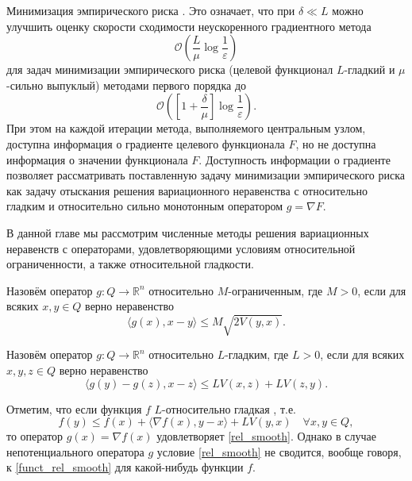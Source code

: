 \begin{example}{Минимизация эмпирического риска \cite{Hendr}.}
        Это означает, что при $\delta \ll L$ можно улучшить оценку скорости сходимости неускоренного градиентного метода $$\mathcal{O}\left(\frac{L}{\mu}\log\frac{1}{\varepsilon}\right)$$
        для задач минимизации эмпирического риска (целевой функционал $L$-гладкий и $\mu$-сильно выпуклый) методами первого порядка до $$\mathcal{O}\left(\left[1+\frac{\delta}{\mu}\right]\log\frac{1}{\varepsilon}\right).$$
        При этом на каждой итерации метода, выполняемого центральным узлом, доступна информация о градиенте целевого функционала $F$, но не доступна информация о значении функционала $F$. Доступность информации о градиенте позволяет рассматривать поставленную задачу минимизации эмпирического риска как задачу отыскания решения вариационного неравенства с относительно гладким и относительно сильно монотонным оператором $g = \nabla F$.
    \end{example}

    В данной главе мы рассмотрим численные методы решения вариационных неравенств с операторами, удовлетворяющими условиям относительной ограниченности, а также относительной гладкости.
    \begin{definition}\label{DefRelBound}\cite{Main}
        Назовём оператор $g: Q \longrightarrow \mathbb{R}^n$ относительно $M$-ограниченным, где $M >0$, если для всяких $x, y \in Q$ верно неравенство
        \begin{equation}\label{rel_bound}
             \langle g(x), x - y \rangle \leq M\sqrt{2V(y,x)}.
         \end{equation}
    \end{definition}
    \begin{definition}\cite{Inex}
        Назовём оператор $g: Q \longrightarrow \mathbb{R}^n$ относительно $L$-гладким, где $L > 0$, если для всяких $x, y, z \in Q$ верно неравенство
        \begin{equation}\label{rel_smooth}
            \langle g(y)-g(z),x-z\rangle \leq LV(x,z) + LV(z,y).
        \end{equation}
    \end{definition}
    Отметим, что если функция $f$ $L$-относительно гладкая \cite{Bauschke}, т.е.
    \begin{equation}\label{funct_rel_smooth}
        f(y) \leq f(x) + \langle \nabla f(x), y - x\rangle + LV(y, x) \quad \forall x, y \in Q,
    \end{equation}
    то оператор $g(x) = \nabla f(x)$ удовлетворяет \eqref{rel_smooth}. Однако в случае непотенциального оператора $g$ условие \eqref{rel_smooth} не сводится, вообще говоря, к \eqref{funct_rel_smooth} для какой-нибудь функции $f$.

